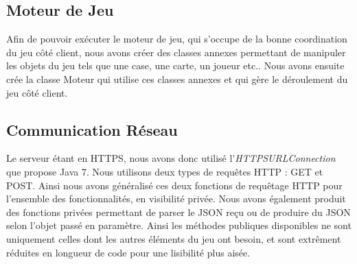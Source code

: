	\subsection{Moteur de Jeu}
		Afin de pouvoir exécuter le moteur de jeu, qui s'occupe de la bonne coordination du jeu côté client, nous avons créer des classes annexes permettant de manipuler les objets du jeu tels que une case, une carte, un joueur etc.. Nous avons ensuite crée la classe Moteur qui utilise ces classes annexes et qui gère le déroulement du jeu côté client.
	\subsection{Communication Réseau}
		Le serveur étant en HTTPS, nous avons donc utilisé l'\textit{HTTPSURLConnection} que propose Java 7. Nous utilisons deux types de requêtes HTTP : GET et POST. Ainsi nous avons 
		généralisé ces deux fonctions de requêtage HTTP pour l'ensemble des fonctionnalités, en visibilité privée. Nous avons également produit des fonctions privées permettant de parser le JSON reçu ou de produire du JSON selon l'objet passé en paramètre. 
		Ainsi les méthodes publiques disponibles ne sont uniquement celles dont les autres éléments du jeu ont besoin, et sont extrêment réduites en longueur de code pour une lisibilité plus aisée.